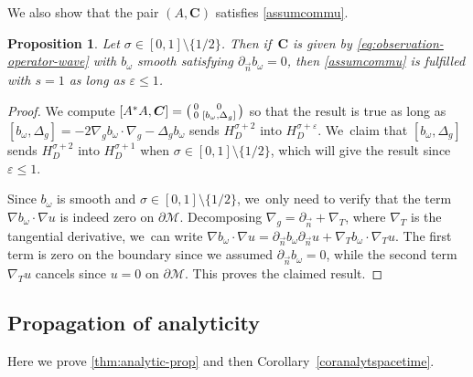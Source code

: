 \documentclass[10pt]{amsart}
\newtheorem{proposition}[theorem]{Proposition}
\theoremstyle{definition}
\let\mc\mathcal
\let\veps\varepsilon
\newcommand{\M}{\mc{M}}
\newcommand{\bC}{\boldsymbol{C}}
\begin{document}
We also show that the pair $(A, \bC)$ satisfies \cref{assumcommu}.
\begin{proposition}\label{propcommutwave}
Let $\sigma\in [0, 1]\setminus \{1/2\}$. Then if~$\bC$ is given by \eqref{eq:observation-operator-wave} with $b_{\omega}$ smooth satisfying $\partial_{\vec n}b_{\omega}=0$, then \cref{assumcommu} is fulfilled with $s=1$ as long as $\veps\leq 1$.
\end{proposition}
\begin{proof}
We compute $[A^*A,\bC]=\begin{psmallmatrix} 0 & 0 \\ 0 & [b_{\omega},\Delta_g]\end{psmallmatrix}$ so that the result is true as long as $[b_{\omega},\Delta_g]=-2\nabla_g b_{\omega}\cdot \nabla_g -\Delta_g b_{\omega}$ sends $H^{\sigma+2}_D$ into $H^{\sigma+\veps}_D$. We~claim that $[b_{\omega},\Delta_g]$ sends $H^{\sigma+2}_D$ into $H^{\sigma+1}_D$ when $\sigma\in [0, 1]\setminus \{1/2\}$, which will give the result since $\veps\leq 1$.

Since $b_{\omega}$ is smooth and $\sigma\in [0, 1]\setminus \{1/2\}$, we~only need to verify that the term $\nabla b_{\omega}\cdot \nabla u$ is indeed zero on $\partial\M$. Decomposing $\nabla_g =\partial_{\vec n}+\nabla_{T}$, where $\nabla_{T}$ is the tangential derivative, we~can write $\nabla b_{\omega}\cdot \nabla u=\partial_{\vec n}b_{\omega} \partial_{\vec n}u+\nabla_T b_{\omega}\cdot \nabla_T u$. The first term is zero on the boundary since we assumed $\partial_{\vec n}b_{\omega}=0$, while the second term $\nabla_T u$ cancels since $u=0$ on $\partial \M$. This proves the claimed result.
\end{proof}

\subsection{Propagation of analyticity}
Here we prove \cref{thm:analytic-prop} and then Corollary~\ref{coranalytspacetime}.
\end{document}
